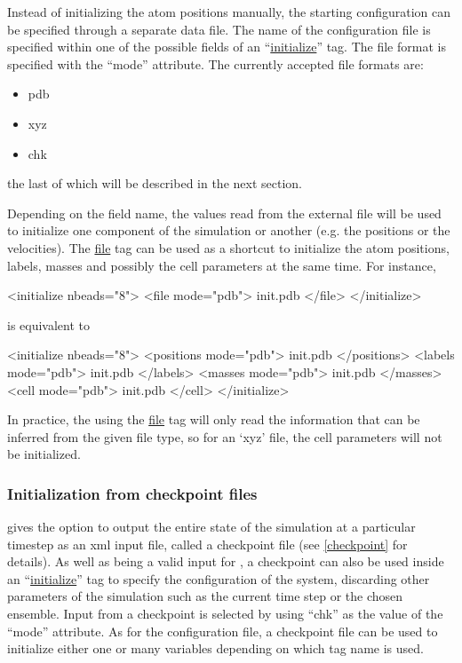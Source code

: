 \documentclass[11pt,english,fleqn]{report}
\newenvironment{code}{%
\footnotesize 
\verbatim
}{
\endverbatim
\normalsize
}
\begin{document}
\label{configfile}

Instead of initializing the atom positions manually, the starting
configuration can be specified through a separate data file. The name
of the configuration file is specified within one of the possible
fields of an {}``\hyperref[INITIALIZER]{initialize}'' tag. 
The file format is specified with the  {}``mode'' attribute.
The currently accepted file formats are:
\begin{itemize}
\item pdb
\item xyz
\item chk
\end{itemize}
the last of which will be described in the next section.

Depending on the field name, the values read from the external file will 
be used to initialize one component of the simulation or another (e.g. the positions
or the velocities). The \hyperref[INITFILE]{file} tag can be used as a shortcut 
to initialize the atom positions, labels, masses and possibly
the cell parameters at the same time. For instance, 

\begin{code}
<initialize nbeads="8">
   <file mode="pdb"> init.pdb </file>
</initialize>
\end{code}

\noindent is equivalent to

\begin{code}
<initialize nbeads="8">
   <positions mode="pdb"> init.pdb </positions>
   <labels mode="pdb"> init.pdb </labels>
   <masses mode="pdb"> init.pdb </masses>
   <cell mode="pdb"> init.pdb </cell>
</initialize>
\end{code}

In practice, the using the \hyperref[INITFILE]{file} tag will only read the information that
can be inferred from the given file type, so for an `xyz' file, the cell
parameters will not be initialized. 


\subsubsection{Initialization from checkpoint files}

\ipi gives the option to output the entire state of the simulation at
a particular timestep as an xml input file, called a checkpoint file
(see \ref{checkpoint} for details). As well as being a valid input
for \ipi{},  a checkpoint can also be used inside an 
``\hyperref[INITIALIZER]{initialize}'' tag to specify the configuration
of the system, discarding other parameters of the simulation such as
the current time step or the chosen ensemble. 
Input from a checkpoint is selected 
by using {}``chk'' as the value of the {}``mode'' attribute. As
for the configuration file, a checkpoint file can be used to initialize
either one or many variables depending on which tag name is used.
\end{document}
